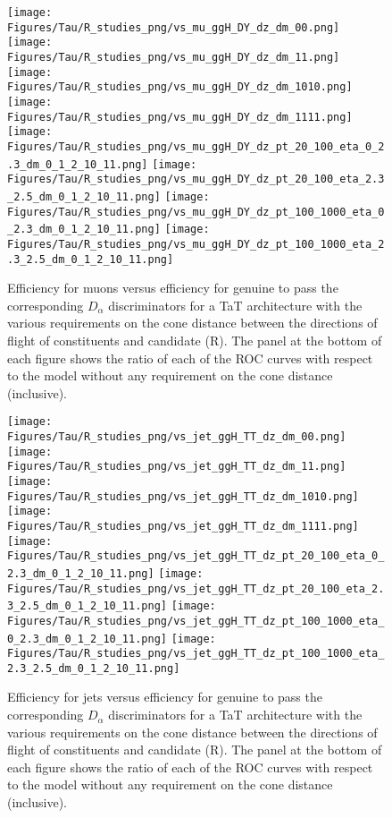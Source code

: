 \begin{figure}[H]
    \centering
    \texttt{[image: Figures/Tau/R\_studies\_png/vs\_mu\_ggH\_DY\_dz\_dm\_00.png]}
    \texttt{[image: Figures/Tau/R\_studies\_png/vs\_mu\_ggH\_DY\_dz\_dm\_11.png]}
    \texttt{[image: Figures/Tau/R\_studies\_png/vs\_mu\_ggH\_DY\_dz\_dm\_1010.png]}
    \texttt{[image: Figures/Tau/R\_studies\_png/vs\_mu\_ggH\_DY\_dz\_dm\_1111.png]}
    \texttt{[image: Figures/Tau/R\_studies\_png/vs\_mu\_ggH\_DY\_dz\_pt\_20\_100\_eta\_0\_2.3\_dm\_0\_1\_2\_10\_11.png]}
    \texttt{[image: Figures/Tau/R\_studies\_png/vs\_mu\_ggH\_DY\_dz\_pt\_20\_100\_eta\_2.3\_2.5\_dm\_0\_1\_2\_10\_11.png]}
    \texttt{[image: Figures/Tau/R\_studies\_png/vs\_mu\_ggH\_DY\_dz\_pt\_100\_1000\_eta\_0\_2.3\_dm\_0\_1\_2\_10\_11.png]}
    \texttt{[image: Figures/Tau/R\_studies\_png/vs\_mu\_ggH\_DY\_dz\_pt\_100\_1000\_eta\_2.3\_2.5\_dm\_0\_1\_2\_10\_11.png]}
    \caption{Efficiency for muons versus efficiency for genuine \tauh to pass the corresponding $D_\alpha$ discriminators for a TaT architecture with the various requirements on the cone distance between the directions of flight of constituents and \tauh candidate (R). The panel at the bottom of each figure shows the ratio of each of the ROC curves with respect to the model without any requirement on the cone distance (inclusive).}
\end{figure}


\begin{figure}[H]
    \centering
    \texttt{[image: Figures/Tau/R\_studies\_png/vs\_jet\_ggH\_TT\_dz\_dm\_00.png]}
    \texttt{[image: Figures/Tau/R\_studies\_png/vs\_jet\_ggH\_TT\_dz\_dm\_11.png]}
    \texttt{[image: Figures/Tau/R\_studies\_png/vs\_jet\_ggH\_TT\_dz\_dm\_1010.png]}
    \texttt{[image: Figures/Tau/R\_studies\_png/vs\_jet\_ggH\_TT\_dz\_dm\_1111.png]}
    \texttt{[image: Figures/Tau/R\_studies\_png/vs\_jet\_ggH\_TT\_dz\_pt\_20\_100\_eta\_0\_2.3\_dm\_0\_1\_2\_10\_11.png]}
    \texttt{[image: Figures/Tau/R\_studies\_png/vs\_jet\_ggH\_TT\_dz\_pt\_20\_100\_eta\_2.3\_2.5\_dm\_0\_1\_2\_10\_11.png]}
    \texttt{[image: Figures/Tau/R\_studies\_png/vs\_jet\_ggH\_TT\_dz\_pt\_100\_1000\_eta\_0\_2.3\_dm\_0\_1\_2\_10\_11.png]}
    \texttt{[image: Figures/Tau/R\_studies\_png/vs\_jet\_ggH\_TT\_dz\_pt\_100\_1000\_eta\_2.3\_2.5\_dm\_0\_1\_2\_10\_11.png]}
    \caption{Efficiency for jets versus efficiency for genuine \tauh to pass the corresponding $D_\alpha$ discriminators for a TaT architecture with the various requirements on the cone distance between the directions of flight of constituents and \tauh candidate (R). The panel at the bottom of each figure shows the ratio of each of the ROC curves with respect to the model without any requirement on the cone distance (inclusive).}
\end{figure}

